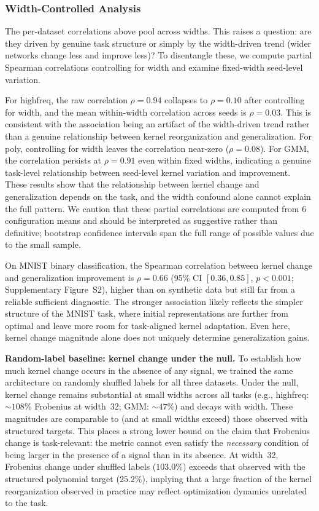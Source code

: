 \documentclass[twoside,11pt]{article}
\begin{document}
\subsubsection{Width-Controlled Analysis}

The per-dataset correlations above pool across widths. This raises a question: are they driven by genuine task structure or simply by the width-driven trend (wider networks change less and improve less)? To disentangle these, we compute partial Spearman correlations controlling for width and examine fixed-width seed-level variation.

For highfreq, the raw correlation $\rho=0.94$ collapses to $\rho=0.10$ after controlling for width, and the mean within-width correlation across seeds is $\rho=0.03$. This is consistent with the association being an artifact of the width-driven trend rather than a genuine relationship between kernel reorganization and generalization. For poly, controlling for width leaves the correlation near-zero ($\rho=0.08$). For GMM, the correlation persists at $\rho=0.91$ even within fixed widths, indicating a genuine task-level relationship between seed-level kernel variation and improvement. These results show that the relationship between kernel change and generalization depends on the task, and the width confound alone cannot explain the full pattern. We caution that these partial correlations are computed from 6 configuration means and should be interpreted as suggestive rather than definitive; bootstrap confidence intervals span the full range of possible values due to the small sample.

On MNIST binary classification, the Spearman correlation between kernel change and generalization improvement is $\rho=0.66$ (95\% CI $[0.36, 0.85]$, $p<0.001$; Supplementary Figure~S2), higher than on synthetic data but still far from a reliable sufficient diagnostic.  The stronger association likely reflects the simpler structure of the MNIST task, where initial representations are further from optimal and leave more room for task-aligned kernel adaptation.  Even here, kernel change magnitude alone does not uniquely determine generalization gains.

\textbf{Random-label baseline: kernel change under the null.}  To establish how much kernel change occurs in the absence of any signal, we trained the same architecture on randomly shuffled labels for all three datasets.  Under the null, kernel change remains substantial at small widths across all tasks (e.g., highfreq: $\sim\!108\%$ Frobenius at width~32; GMM: $\sim\!47\%$) and decays with width.  These magnitudes are comparable to (and at small widths exceed) those observed with structured targets. This places a strong lower bound on the claim that Frobenius change is task-relevant: the metric cannot even satisfy the \emph{necessary} condition of being larger in the presence of a signal than in its absence.  At width~32, Frobenius change under shuffled labels ($103.0\%$) exceeds that observed with the structured polynomial target ($25.2\%$), implying that a large fraction of the kernel reorganization observed in practice may reflect optimization dynamics unrelated to the task.
\end{document}
